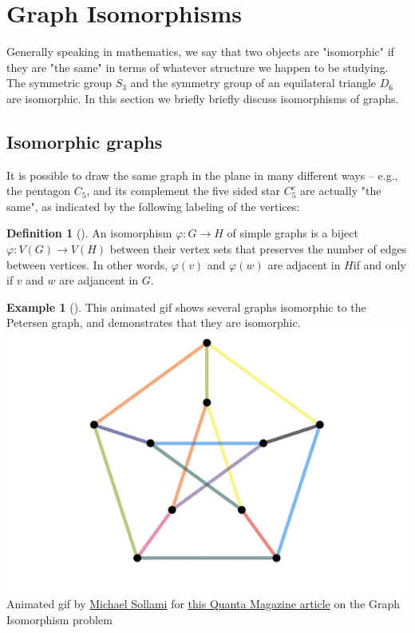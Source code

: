 \documentclass[10pt,]{book}
\theoremstyle{plain}
\theoremstyle{definition}
\newtheorem{definition}[theorem]{Definition}
\theoremstyle{definition}
\newtheorem{example}[theorem]{Example}
\theoremstyle{definition}
\begin{document}
\section[{Graph Isomorphisms}]{Graph Isomorphisms}\label{s_intro_isomorphisms}
\hypertarget{p-37}{}%
Generally speaking in mathematics, we say that two objects are "isomorphic" if they are "the same" in terms of whatever structure we happen to be studying.  The symmetric group \(S_3\) and the symmetry group of an equilateral triangle \(D_6\) are isomorphic.  In this section we briefly briefly discuss isomorphisms of graphs.%
\typeout{************************************************}
\typeout{************************************************}
\subsection[{Isomorphic graphs}]{Isomorphic graphs}\label{subsection-7}
\hypertarget{p-38}{}%
It is possible to draw the same graph in the plane in many different ways – e.g., the pentagon \(C_5\), and its complement the five sided star \(C_5^c\) are actually "the same", as indicated by the following labeling of the vertices:%
\begin{definition}[{}]\label{definition-9}
\hypertarget{p-39}{}%
An isomorphism \(\varphi:G\to H\) of simple graphs is a biject \(\varphi:V(G)\to V(H)\) between their vertex sets that preserves the number of edges between vertices.  In other words, \(\varphi(v)\) and \(\varphi(w)\) are adjacent in \(H\)if and only if \(v\) and \(w\) are adjancent in \(G\).%
\end{definition}
\begin{example}[]\label{example-7}
\hypertarget{p-40}{}%
This animated gif shows several graphs isomorphic to the Petersen graph, and demonstrates that they are isomorphic.%
\includegraphics[width=1\linewidth]{images/PetersenIsomorphismAnimated.gif}
\hypertarget{p-41}{}%
Animated gif by \href{https://msollami.com/code/2014/12/24/graph-isomorphisms}{Michael Sollami} for \href{https://www.quantamagazine.org/algorithm-solves-graph-isomorphism-in-record-time-20151214/}{this Quanta Magazine article} on the Graph Isomorphism problem%
\end{example}
\end{document}
